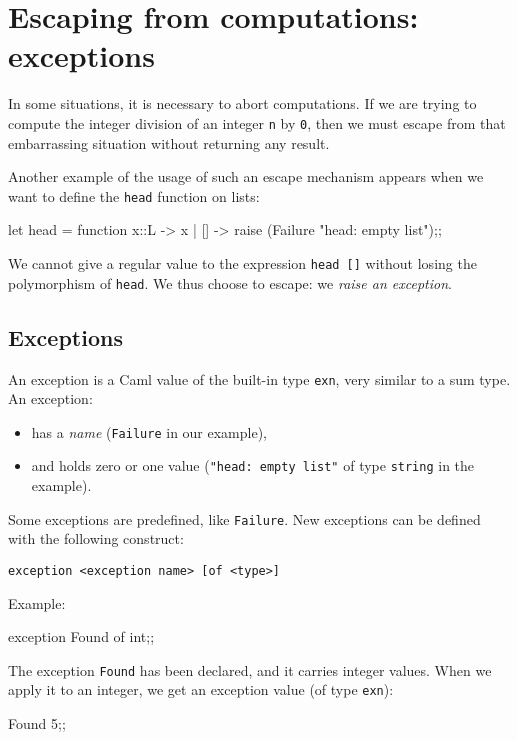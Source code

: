 \chapter{Escaping from computations: exceptions}
\label{c:exceptions}

In some situations, it is necessary to abort computations.
If we are
trying to compute the integer division of an integer {\tt n} by {\tt 0},
then we must escape from that embarrassing situation without returning any
result.

Another example of the usage of such an escape mechanism appears when we
want to define the {\tt head} function on lists:%
\begin{caml_example}
let head = function
     x::L -> x
   | [] -> raise (Failure "head: empty list");;
\end{caml_example}
We cannot give a regular value to the expression {\tt head []} without
losing the polymorphism of {\tt head}. We thus choose to escape: we {\em
raise an exception}.

\section{Exceptions}

An exception is a Caml value of the built-in type \verb"exn", very similar to a sum type. An exception:
\begin{itemize}
\item has a {\em name} ({\tt Failure} in our example),
\item and holds zero or one value ({\tt "head: empty list"} of type {\tt string} in the example).
\end{itemize}

Some exceptions are predefined, like {\tt Failure}. New 
exceptions can be defined with the following construct:
\begin{verbatim}
exception <exception name> [of <type>]
\end{verbatim}

Example:%
\begin{caml_example}
exception Found of int;;
\end{caml_example}
The exception {\tt Found} has been declared, and it carries integer
values. When we apply it to an integer, we get an exception value
(of type \verb"exn"):
\begin{caml_example}
Found 5;;
\end{caml_example}

